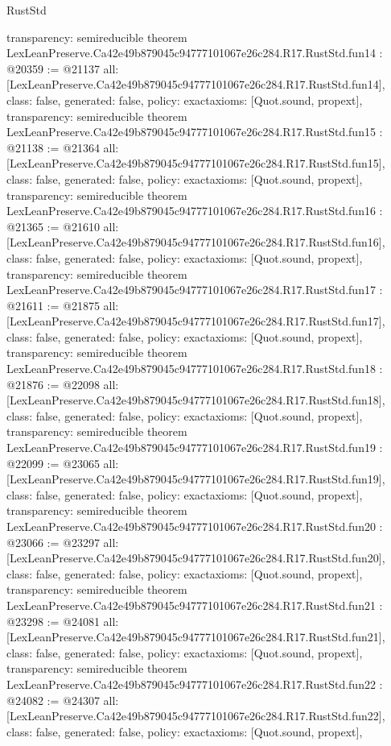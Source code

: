 \begin{lexlean}{RustStd}
\begin{coremodule}
{  transparency: semireducible
}
theorem LexLeanPreserve.Ca42e49b879045c94777101067e26c284.R17.RustStd.fun14 : @20359 := @21137 {
  all: [LexLeanPreserve.Ca42e49b879045c94777101067e26c284.R17.RustStd.fun14],
  class: false,
  generated: false,
  policy: exact{axioms: [Quot.sound, propext]},
  transparency: semireducible
}
theorem LexLeanPreserve.Ca42e49b879045c94777101067e26c284.R17.RustStd.fun15 : @21138 := @21364 {
  all: [LexLeanPreserve.Ca42e49b879045c94777101067e26c284.R17.RustStd.fun15],
  class: false,
  generated: false,
  policy: exact{axioms: [Quot.sound, propext]},
  transparency: semireducible
}
theorem LexLeanPreserve.Ca42e49b879045c94777101067e26c284.R17.RustStd.fun16 : @21365 := @21610 {
  all: [LexLeanPreserve.Ca42e49b879045c94777101067e26c284.R17.RustStd.fun16],
  class: false,
  generated: false,
  policy: exact{axioms: [Quot.sound, propext]},
  transparency: semireducible
}
theorem LexLeanPreserve.Ca42e49b879045c94777101067e26c284.R17.RustStd.fun17 : @21611 := @21875 {
  all: [LexLeanPreserve.Ca42e49b879045c94777101067e26c284.R17.RustStd.fun17],
  class: false,
  generated: false,
  policy: exact{axioms: [Quot.sound, propext]},
  transparency: semireducible
}
theorem LexLeanPreserve.Ca42e49b879045c94777101067e26c284.R17.RustStd.fun18 : @21876 := @22098 {
  all: [LexLeanPreserve.Ca42e49b879045c94777101067e26c284.R17.RustStd.fun18],
  class: false,
  generated: false,
  policy: exact{axioms: [Quot.sound, propext]},
  transparency: semireducible
}
theorem LexLeanPreserve.Ca42e49b879045c94777101067e26c284.R17.RustStd.fun19 : @22099 := @23065 {
  all: [LexLeanPreserve.Ca42e49b879045c94777101067e26c284.R17.RustStd.fun19],
  class: false,
  generated: false,
  policy: exact{axioms: [Quot.sound, propext]},
  transparency: semireducible
}
theorem LexLeanPreserve.Ca42e49b879045c94777101067e26c284.R17.RustStd.fun20 : @23066 := @23297 {
  all: [LexLeanPreserve.Ca42e49b879045c94777101067e26c284.R17.RustStd.fun20],
  class: false,
  generated: false,
  policy: exact{axioms: [Quot.sound, propext]},
  transparency: semireducible
}
theorem LexLeanPreserve.Ca42e49b879045c94777101067e26c284.R17.RustStd.fun21 : @23298 := @24081 {
  all: [LexLeanPreserve.Ca42e49b879045c94777101067e26c284.R17.RustStd.fun21],
  class: false,
  generated: false,
  policy: exact{axioms: [Quot.sound, propext]},
  transparency: semireducible
}
theorem LexLeanPreserve.Ca42e49b879045c94777101067e26c284.R17.RustStd.fun22 : @24082 := @24307 {
  all: [LexLeanPreserve.Ca42e49b879045c94777101067e26c284.R17.RustStd.fun22],
  class: false,
  generated: false,
  policy: exact{axioms: [Quot.sound, propext]},
}
\end{coremodule}
\end{lexlean}
